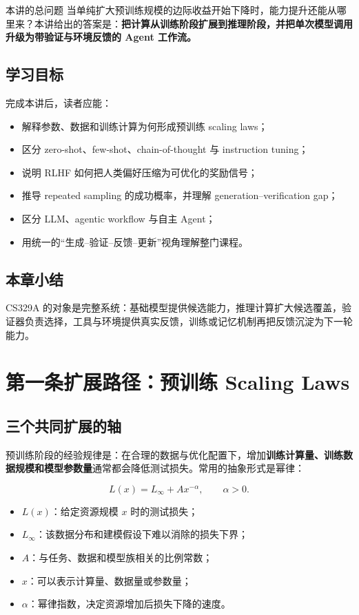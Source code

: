 \documentclass[a4paper]{article}
\begin{document}
\begin{importantbox}{本讲的总问题}
当单纯扩大预训练规模的边际收益开始下降时，能力提升还能从哪里来？本讲给出的答案是：\textbf{把计算从训练阶段扩展到推理阶段，并把单次模型调用升级为带验证与环境反馈的 Agent 工作流。}
\end{importantbox}

\subsection{学习目标}

完成本讲后，读者应能：

\begin{itemize}
    \item 解释参数、数据和训练计算为何形成预训练 scaling laws；
    \item 区分 zero-shot、few-shot、chain-of-thought 与 instruction tuning；
    \item 说明 RLHF 如何把人类偏好压缩为可优化的奖励信号；
    \item 推导 repeated sampling 的成功概率，并理解 generation--verification gap；
    \item 区分 LLM、agentic workflow 与自主 Agent；
    \item 用统一的“生成--验证--反馈--更新”视角理解整门课程。
\end{itemize}

\subsection{本章小结}

CS329A 的对象是完整系统：基础模型提供候选能力，推理计算扩大候选覆盖，验证器负责选择，工具与环境提供真实反馈，训练或记忆机制再把反馈沉淀为下一轮能力。

\section{第一条扩展路径：预训练 Scaling Laws}

\subsection{三个共同扩展的轴}

预训练阶段的经验规律是：在合理的数据与优化配置下，增加\textbf{训练计算量、训练数据规模和模型参数量}通常都会降低测试损失。常用的抽象形式是幂律：

$$
L(x)=L_{\infty}+A x^{-\alpha},\qquad \alpha>0.
$$

\begin{itemize}
    \item $L(x)$：给定资源规模 $x$ 时的测试损失；
    \item $L_{\infty}$：该数据分布和建模假设下难以消除的损失下界；
    \item $A$：与任务、数据和模型族相关的比例常数；
    \item $x$：可以表示计算量、数据量或参数量；
    \item $\alpha$：幂律指数，决定资源增加后损失下降的速度。
\end{itemize}
\end{document}
